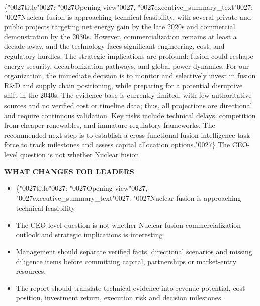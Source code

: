 \documentclass[10pt,a4paper]{article}
\newcommand{\BOApos}{{\BOQuoteFont\char"0027}}
\begin{document}
\begin{minipage}[t]{0.48\linewidth}
{\small\color{BOText} \{\BOApos{}title\BOApos{}: \BOApos{}Opening view\BOApos{}, \BOApos{}executive\_summary\_text\BOApos{}: \BOApos{}Nuclear fusion is approaching technical feasibility, with several private and public projects targeting net energy gain by the late 2020s and commercial demonstration by the 2030s. However, commercialization remains at least a decade away, and the technology faces significant engineering, cost, and regulatory hurdles. The strategic implications are profound: fusion could reshape energy security, decarbonization pathways, and global power dynamics. For our organization, the immediate decision is to monitor and selectively invest in fusion R\&D and supply chain positioning, while preparing for a potential disruptive shift in the 2040s. The evidence base is currently limited, with few authoritative sources and no verified cost or timeline data; thus, all projections are directional and require continuous validation. Key risks include technical delays, competition from cheaper renewables, and immature regulatory frameworks. The recommended next step is to establish a cross-functional fusion intelligence task force to track milestones and assess capital allocation options.\BOApos{}\} The CEO-level question is not whether Nuclear fusion}\par
\end{minipage}\hfill\begin{minipage}[t]{0.45\linewidth}
{\textcolor{BOGreen}{\scriptsize\bfseries WHAT CHANGES FOR LEADERS}}\par\vspace{3pt}
{\footnotesize \begin{itemize}
\item \{\BOApos{}title\BOApos{}: \BOApos{}Opening view\BOApos{}, \BOApos{}executive\_summary\_text\BOApos{}: \BOApos{}Nuclear fusion is approaching technical feasibility
\item The CEO-level question is not whether Nuclear fusion commercialization outlook and strategic implications is interesting
\item Management should separate verified facts, directional scenarios and missing diligence items before committing capital, partnerships or market-entry resources.
\item The report should translate technical evidence into revenue potential, cost position, investment return, execution risk and decision milestones.
\end{itemize}
}\end{minipage}
\clearpage
\end{document}
